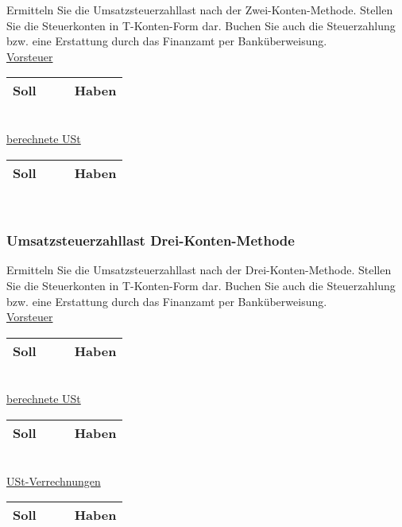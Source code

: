 \documentclass[paper=a4, fontsize=11pt]{scrartcl}
\numberwithin{equation}{section}
\numberwithin{figure}{section}
\numberwithin{table}{section}
\begin{document}
{Ermitteln Sie die Umsatzsteuerzahllast nach der Zwei-Konten-Methode. Stellen Sie die Steuerkonten in T-Konten-Form dar. Buchen Sie auch die Steuerzahlung bzw. eine Erstattung durch das Finanzamt per Banküberweisung. \\

\underline{Vorsteuer}

\begin{tabular}{cc|cc}
\hline
Soll & & & Haben \\
\hline
\end{tabular}
\\

\underline{berechnete USt}

\begin{tabular}{cc|cc}
\hline
Soll & & & Haben \\
\hline
\end{tabular}
\\


\subsubsection{Umsatzsteuerzahllast Drei-Konten-Methode}

Ermitteln Sie die Umsatzsteuerzahllast nach der Drei-Konten-Methode. Stellen Sie die Steuerkonten in T-Konten-Form dar. Buchen Sie auch die Steuerzahlung bzw. eine Erstattung durch das Finanzamt per Banküberweisung. \\

\underline{Vorsteuer}

\begin{tabular}{cc|cc}
\hline
Soll & & & Haben \\
\hline
\end{tabular}
\\

\underline{berechnete USt}

\begin{tabular}{cc|cc}
\hline
Soll & & & Haben \\
\hline
\end{tabular}
\\

\underline{USt-Verrechnungen}

\begin{tabular}{cc|cc}
\hline
Soll & & & Haben \\
\hline
\end{tabular}
\\

}
\end{document}
